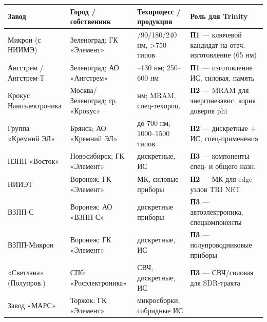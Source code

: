 \documentclass[
  russian,
]{article}
\begin{document}
\begin{longtable}[]{@{}
  >{\raggedright\arraybackslash}p{}
  >{\raggedright\arraybackslash}p{}
  >{\raggedright\arraybackslash}p{}
  >{\raggedright\arraybackslash}p{}@{}}
\toprule\noalign{}
\begin{minipage}[b]{\linewidth}\raggedright
Завод
\end{minipage} & \begin{minipage}[b]{\linewidth}\raggedright
Город / собственник
\end{minipage} & \begin{minipage}[b]{\linewidth}\raggedright
Техпроцесс / продукция
\end{minipage} & \begin{minipage}[b]{\linewidth}\raggedright
Роль для Trinity
\end{minipage} \\
\midrule\noalign{}
\endhead
\bottomrule\noalign{}
\endlastfoot
Микрон (с НИИМЭ) & Зеленоград; ГК «Элемент» & 65/90/180/240 нм,
\textgreater750 типов & \textbf{П1} --- ключевой кандидат на отеч.
изготовление (65 нм) \\
Ангстрем / Ангстрем-Т & Зеленоград; АО «Ангстрем» & 90--130 нм; 250--600
нм & \textbf{П1} --- изготовление ИС, силовая, память \\
Крокус Наноэлектроника & Москва/Зеленоград; гр. «Крокус» & 90 нм; MRAM,
спец-техпроц. & \textbf{П2} --- MRAM для энергонезавис. корня доверия
phi \\
Группа «Кремний ЭЛ» & Брянск; АО «Кремний ЭЛ» & до 700 нм; 1000--1500
типов & \textbf{П2} --- дискретные + ИС, спец-применения \\
НЗПП «Восток» & Новосибирск; ГК «Элемент» & дискретные, ИС & \textbf{П3}
--- компоненты спец- и общего назн. \\
НИИЭТ & Воронеж; ГК «Элемент» & МК, силовые приборы & \textbf{П2} --- МК
для edge-узлов TRI NET \\
ВЗПП-С & Воронеж; АО «ВЗПП-С» & дискретные приборы & \textbf{П3} ---
автоэлектроника, спецкомпоненты \\
ВЗПП-Микрон & Воронеж; ГК «Элемент» & дискретные, ИС & \textbf{П3} ---
полупроводниковые приборы \\
«Светлана» (Полупров.) & СПб; «Росэлектроника» & СВЧ, дискретные, ИС &
\textbf{П3} --- СВЧ/силовая для SDR-тракта \\
Завод «МАРС» & Торжок; ГК «Элемент» & микросборки, гибридные ИС &

\end{longtable}
\end{document}

